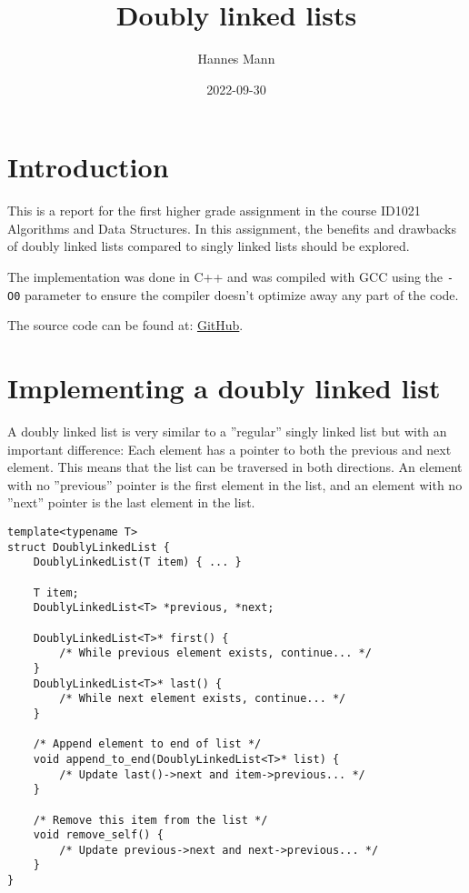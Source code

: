 \documentclass[a4paper,11pt]{article}
\begin{document}
\title{
    \textbf{Doubly linked lists}
}
\author{Hannes Mann}
\date{2022-09-30}

\maketitle

\section*{Introduction}

This is a report for the first higher grade assignment in the course ID1021 Algorithms and Data Structures.
In this assignment, the benefits and drawbacks of doubly linked lists compared to singly linked lists should be explored.

The implementation was done in C++ and was compiled with GCC using the {\tt -O0} parameter to ensure the compiler doesn't optimize away any part of the code.

The source code can be found at: \href{https://github.com/HannesMann/ID1021/tree/main/src/doubly_linked_list}{GitHub}.

\section*{Implementing a doubly linked list}

A doubly linked list is very similar to a ''regular'' singly linked list but with an important difference: Each element has a pointer to both the previous and next element.
This means that the list can be traversed in both directions.
An element with no ''previous'' pointer is the first element in the list, and an element with no ''next'' pointer is the last element in the list.

\begin{verbatim}
template<typename T>
struct DoublyLinkedList {
	DoublyLinkedList(T item) { ... }

	T item;
	DoublyLinkedList<T> *previous, *next;

	DoublyLinkedList<T>* first() {
		/* While previous element exists, continue... */
	}
	DoublyLinkedList<T>* last() {
		/* While next element exists, continue... */
	}

	/* Append element to end of list */
	void append_to_end(DoublyLinkedList<T>* list) {
		/* Update last()->next and item->previous... */
	}

	/* Remove this item from the list */
	void remove_self() {
		/* Update previous->next and next->previous... */
	}
}
\end{verbatim}
\end{document}
